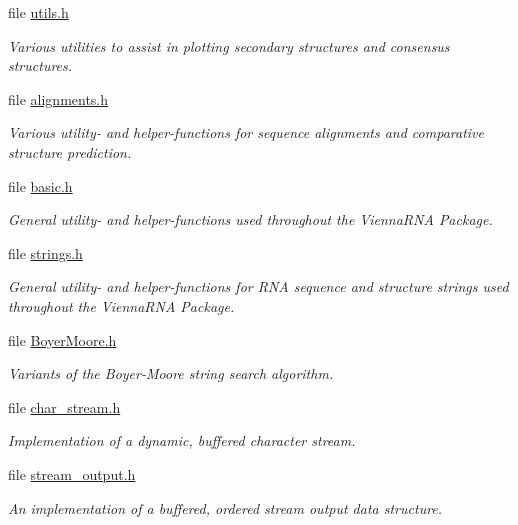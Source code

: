 \begin{DoxyCompactItemize}
file \hyperlink{plotting_2utils_8h}{utils.\+h}
\begin{DoxyCompactList}\small\item\em Various utilities to assist in plotting secondary structures and consensus structures. \end{DoxyCompactList}\item 
file \hyperlink{utils_2alignments_8h}{alignments.\+h}
\begin{DoxyCompactList}\small\item\em Various utility-\/ and helper-\/functions for sequence alignments and comparative structure prediction. \end{DoxyCompactList}\item 
file \hyperlink{utils_2basic_8h}{basic.\+h}
\begin{DoxyCompactList}\small\item\em General utility-\/ and helper-\/functions used throughout the {\itshape Vienna\+R\+NA} {\itshape Package}. \end{DoxyCompactList}\item 
file \hyperlink{strings_8h}{strings.\+h}
\begin{DoxyCompactList}\small\item\em General utility-\/ and helper-\/functions for R\+NA sequence and structure strings used throughout the Vienna\+R\+NA Package. \end{DoxyCompactList}\item 
file \hyperlink{BoyerMoore_8h}{Boyer\+Moore.\+h}
\begin{DoxyCompactList}\small\item\em Variants of the Boyer-\/\+Moore string search algorithm. \end{DoxyCompactList}\item 
file \hyperlink{datastructures_2char__stream_8h}{char\+\_\+stream.\+h}
\begin{DoxyCompactList}\small\item\em Implementation of a dynamic, buffered character stream. \end{DoxyCompactList}\item 
file \hyperlink{datastructures_2stream__output_8h}{stream\+\_\+output.\+h}
\begin{DoxyCompactList}\small\item\em An implementation of a buffered, ordered stream output data structure. \end{DoxyCompactList}\end{DoxyCompactItemize}
